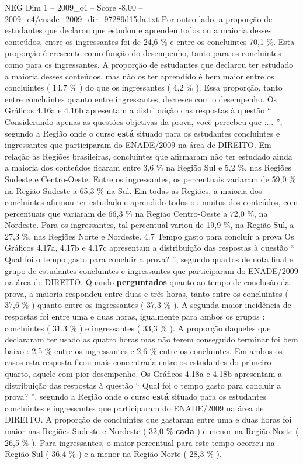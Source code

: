 \begin{textsample}{NEG Dim 1 – 2009\_c4 – Score -8.00 – 2009\_c4/enade\_2009\_dir\_97289d15da.txt}
Por outro lado, a proporção de estudantes que declarou que estudou e aprendeu todos ou a maioria desses conteúdos, entre os ingressantes foi de 24,6 \% e entre os concluintes 70,1 \%.
Esta proporção é crescente como função do desempenho, tanto para os concluintes como para os ingressantes.
A proporção de estudantes que declarou ter estudado a maioria desses conteúdos, mas não os ter aprendido é bem maior entre os concluintes ( 14,7 \% ) do que os ingressantes ( 4,2 \% ).
Essa proporção, tanto entre concluintes quanto entre ingressantes, decresce com o desempenho.
Os Gráficos 4.16a e 4.16b apresentam a distribuição das respostas à questão “ Considerando apenas as questões objetivas da prova, você percebeu que :... ”, segundo a Região onde o curso \textbf{está} situado para os estudantes concluintes e ingressantes que participaram do ENADE/2009 na área de DIREITO.
Em relação às Regiões brasileiras, concluintes que afirmaram não ter estudado ainda a maioria dos conteúdos ficaram entre 3,6 \% na Região Sul e 5,2 \%, nas Regiões Sudeste e Centro-Oeste.
Entre os ingressantes, os percentuais variaram de 59,0 \% na Região Sudeste a 65,3 \% na Sul.
Em todas as Regiões, a maioria dos concluintes afirmou ter estudado e aprendido todos ou muitos dos conteúdos, com percentuais que variaram de 66,3 \% na Região Centro-Oeste a 72,0 \%, na Nordeste.
Para os ingressantes, tal percentual variou de 19,9 \%, na Região Sul, a 27,3 \%, nas Regiões Norte e Nordeste. 4.7 Tempo gasto para concluir a prova Os Gráficos 4.17a, 4.17b e 4.17c apresentam a distribuição das respostas à questão “ Qual foi o tempo gasto para concluir a prova? ”, segundo quartos de nota final e grupo de estudantes concluintes e ingressantes que participaram do ENADE/2009 na área de DIREITO.
Quando \textbf{perguntados} quanto ao tempo de conclusão da prova, a maioria respondeu entre duas e três horas, tanto entre os concluintes ( 37,6 \% ) quanto entre os ingressantes ( 37,3 \% ).
A segunda maior incidência de respostas foi entre uma e duas horas, igualmente para ambos os grupos : concluintes ( 31,3 \% ) e ingressantes ( 33,3 \% ).
A proporção daqueles que declararam ter usado as quatro horas mas não terem conseguido terminar foi bem baixo : 2,5 \% entre os ingressantes e 2,6 \% entre os concluintes.
Em ambos os casos esta resposta ficou mais concentrada entre os estudantes do primeiro quarto, aquele com pior desempenho.
Os Gráficos 4.18a e 4.18b apresentam a distribuição das respostas à questão “ Qual foi o tempo gasto para concluir a prova? ”, segundo a Região onde o curso \textbf{está} situado para os estudantes concluintes e ingressantes que participaram do ENADE/2009 na área de DIREITO.
A proporção de concluintes que gastaram entre uma e duas horas foi maior nas Regiões Sudeste e Nordeste ( 32,0 \% \textbf{cada} ) e menor na Região Norte ( 26,5 \% ).
Para ingressantes, o maior percentual para este tempo ocorreu na Região Sul ( 36,4 \% ) e a menor na Região Norte ( 28,3 \% ).

\end{textsample}
